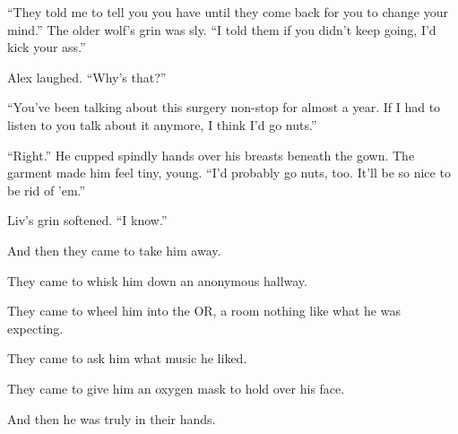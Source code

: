``They told me to tell you you have until they come back for you to change your mind.'' The older wolf's grin was sly. ``I told them if you didn't keep going, I'd kick your ass.''

Alex laughed. ``Why's that?''

``You've been talking about this surgery non-stop for almost a year. If I had to listen to you talk about it anymore, I think I'd go nuts.''

``Right.'' He cupped spindly hands over his breasts beneath the gown. The garment made him feel tiny, young. ``I'd probably go nuts, too. It'll be so nice to be rid of 'em.''

Liv's grin softened. ``I know.''

And then they came to take him away.

They came to whisk him down an anonymous hallway.

They came to wheel him into the OR, a room nothing like what he was expecting.

They came to ask him what music he liked.

They came to give him an oxygen mask to hold over his face.

And then he was truly in their hands.
